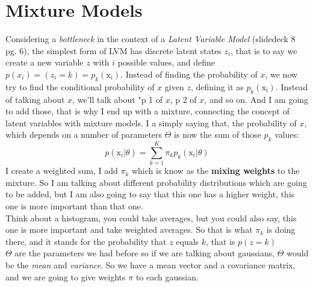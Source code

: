 \section{Mixture Models}
Considering a \textit{bottleneck} in the context of a \textit{Latent Variable Model} (slidedeck 8 pg. 6), the simplest form of LVM has discrete latent states $z_i$, that is to say we create a new variable $z$ with $i$ possible values, and define $p(x_i)=(z_i=k)=p_k(\mathrm{x}_i)$. Instead of finding the probability of $x$, we now try to find the conditional probability of $x$ given $z$, defining it as $p_k(\mathrm{x_i})$. Instead of talking about $x$, we'll talk about "p 1 of $x$, p 2 of $x$, and so on. And I am going to add those, that is why I end up with a mixture, connecting the concept of latent variables with mixture models. I a simply saying that, the probability of $x$, which depends on a number of parameters $\Theta$ is now the sum of those $p_k$ values:
\begin{equation}
    p(\mathrm{x}_i|\theta)=\sum_{k=1}^K \pi_k p_k (\mathrm{x}_i|\theta)
\end{equation}
I create a weighted sum, I add $\pi_k$ which is know as the \textbf{mixing weights} to the mixture. So I am talking about different probability distributions which are going to be added, but I am also going to say that this one has a higher weight, this one is more important than that one. \\
Think about a histogram, you could take averages, but you could also say, this one is more important and take weighted averages. So that is what $\pi_k$ is doing there, and it stands for the probability that $z$ equals $k$, that is $p(z=k)$ \\
$\Theta$ are the parameters we had before so if we are talking about gaussians, $\Theta$ would be the \textit{mean} and \textit{variance}. So we have a mean vector and a covariance matrix, and we are going to give weights $\pi$ to each gaussian.